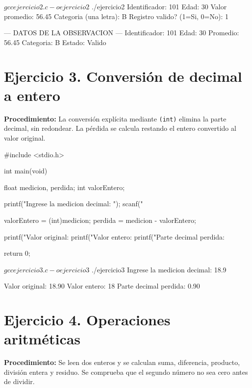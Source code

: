\documentclass[11pt, a4paper]{article}
\begin{document}
\begin{terminalout}
$ gcc ejercicio2.c -o ejercicio2
$ ./ejercicio2
Identificador: 101
Edad: 30
Valor promedio: 56.45
Categoria (una letra): B
Registro valido? (1=Si, 0=No): 1

--- DATOS DE LA OBSERVACION ---
Identificador: 101
Edad: 30
Promedio: 56.45
Categoria: B
Estado: Valido
\end{terminalout}

\newpage

\section*{Ejercicio 3. Conversión de decimal a entero}
\textbf{Procedimiento:} La conversión explícita mediante \texttt{(int)} elimina la parte decimal, sin redondear. La pérdida se calcula restando el entero convertido al valor original.

\begin{codebox}[title={CÓDIGO FUENTE EN C: Ejercicio 3}]
#include <stdio.h>

int main(void) {
    float medicion, perdida;
    int valorEntero;

    printf("Ingrese la medicion decimal: ");
    scanf("%

    valorEntero = (int)medicion;
    perdida = medicion - valorEntero;

    printf("Valor original: %
    printf("Valor entero: %
    printf("Parte decimal perdida: %

    return 0;
}
\end{codebox}

\begin{terminalout}
$ gcc ejercicio3.c -o ejercicio3
$ ./ejercicio3
Ingrese la medicion decimal: 18.9

Valor original: 18.90
Valor entero: 18
Parte decimal perdida: 0.90
\end{terminalout}

\newpage

\section*{Ejercicio 4. Operaciones aritméticas}
\textbf{Procedimiento:} Se leen dos enteros y se calculan suma, diferencia, producto, división entera y residuo. Se comprueba que el segundo número no sea cero antes de dividir.
\end{document}
